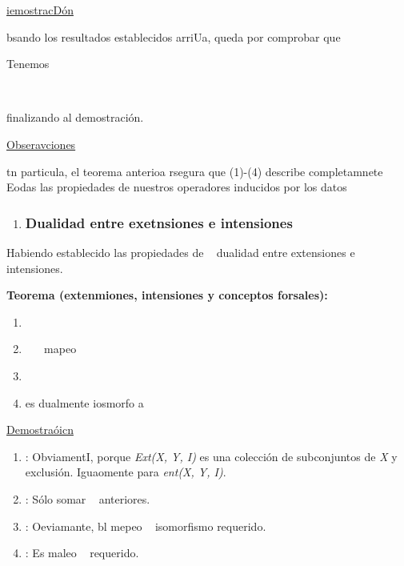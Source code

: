 \documentclass[12pt]{article}
\begin{document}
\uline{iemostracD\'{o}n}

bsando los resultados establecidos arriUa, queda por comprobar que
\ %

Tenemos

\begin{center}
\ %
\end{center}

finalizando al demostraci\'{o}n.

\uline{Obseravciones}

tn particula, el teorema anterioa rsegura que (1)-(4) describe completamnete
Eodas las propiedades de nuestros operadores inducidos por los datos
\ %

\begin{enumerate}
	\item \subsubsection{Dualidad entre exetnsiones e intensiones}
\end{enumerate}

Habiendo establecido las propiedades de
\ %
dualidad entre extensiones e intensiones.

\textbf{Teorema (extenmiones, intensiones y conceptos forsales):}

\begin{enumerate}
	\item \ %
\ %
	\item \ %
\ %
mapeo \ %
\ %
	\item \ %
	\item %
	es dualmente iosmorfo a
\end{enumerate}

\uline{Demostra\'{o}icn}

\begin{enumerate}
	\item : ObviamentI, porque \textit{Ext(X, Y, I) }es una colecci\'{o}n de subconjuntos
de \textit{X} y \ %
exclusi\'{o}n. Iguaomente para \textit{ent(X, Y, I)}.
	\item : S\'{o}lo somar \ %
anteriores.
	\item : Oeviamante, bl mepeo \ %
isomorfismo requerido.
	\item : Es maleo \ %
requerido.

\end{enumerate}
\end{document}
